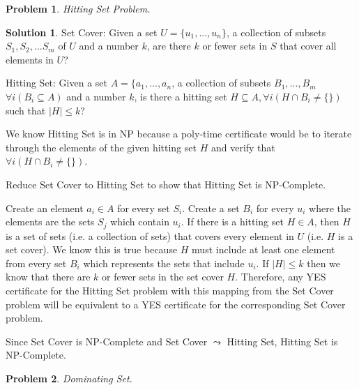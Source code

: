 \documentclass{article}
\newtheorem{problem}{Problem}
\theoremstyle{definition}
\newtheorem*{solution}{Solution}
\begin{document}
\begin{problem}

Hitting Set Problem.

\end{problem}

\begin{solution}

Set Cover: Given a set \(U=\{u_1,...,u_n\}\), a collection of subsets \(S_1,S_2,...S_m\) of \(U\) and a number \(k\), are there \(k\) or fewer sets in \(S\) that cover all elements in \(U\)?

Hitting Set: Given a set \(A=\{a_1,...,a_n\), a collection  of subsets \(B_1,...,B_m\) \( \forall i (B_i\subseteq A) \) and a number \(k\), is there a hitting set \(H\subseteq A, \forall i (H\cap B_i \neq \{\}) \) such that \(|H|\leq k\)?

We know Hitting Set is in NP because a poly-time certificate would be to iterate through the elements of the given hitting set \(H\) and verify that \(\forall i (H\cap B_i \neq \{\}) \).

Reduce Set Cover to Hitting Set to show that Hitting Set is NP-Complete.

Create an element \(a_i\in A\) for every set \(S_i\). Create a set \(B_i\) for every \(u_i\) where the elements are the sets \(S_j\) which contain \(u_i\). If there is a hitting set \(H\in A\), then \(H\) is a set of sets (i.e. a collection of sets) that covers every element in \(U\) (i.e. \(H\) is a set cover). We know this is true because \(H\) must include at least one element from every set \(B_i\) which represents the sets that include \(u_i\). If \(|H|\leq k\) then we know that there are \(k\) or fewer sets in the set cover \(H\). Therefore, any YES certificate for the Hitting Set problem with this mapping from the Set Cover problem will be equivalent to a YES certificate for the corresponding Set Cover problem.

Since Set Cover is NP-Complete and Set Cover \(\leadsto \) Hitting Set, Hitting Set is NP-Complete.

\end{solution}

\begin{problem}

Dominating Set.

\end{problem}
\end{document}
